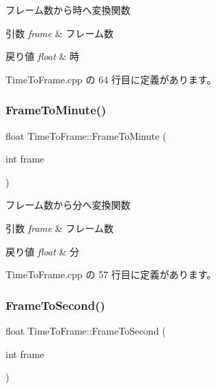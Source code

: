 フレーム数から時へ変換関数 


\begin{DoxyParams}{引数}
{\em frame} & フレーム数 \\
\hline
\end{DoxyParams}

\begin{DoxyRetVals}{戻り値}
{\em float} & 時 \\
\hline
\end{DoxyRetVals}


 Time\+To\+Frame.\+cpp の 64 行目に定義があります。

\mbox{\label{class_time_to_frame_a1ec1bf2a0e8ad53782b2ad0bce8b7c78}} 
\subsubsection{\texorpdfstring{Frame\+To\+Minute()}{FrameToMinute()}}
{\footnotesize\ttfamily float Time\+To\+Frame\+::\+Frame\+To\+Minute (\begin{DoxyParamCaption}\item[{int}]{frame }\end{DoxyParamCaption})\hspace{0.3cm}{\ttfamily [static]}}



フレーム数から分へ変換関数 


\begin{DoxyParams}{引数}
{\em frame} & フレーム数 \\
\hline
\end{DoxyParams}

\begin{DoxyRetVals}{戻り値}
{\em float} & 分 \\
\hline
\end{DoxyRetVals}


 Time\+To\+Frame.\+cpp の 57 行目に定義があります。

\mbox{\label{class_time_to_frame_a3d24db23e04cc41af8106883b4598b00}} 
\subsubsection{\texorpdfstring{Frame\+To\+Second()}{FrameToSecond()}}
{\footnotesize\ttfamily float Time\+To\+Frame\+::\+Frame\+To\+Second (\begin{DoxyParamCaption}\item[{int}]{frame }\end{DoxyParamCaption})\hspace{0.3cm}{\ttfamily [static]}}



